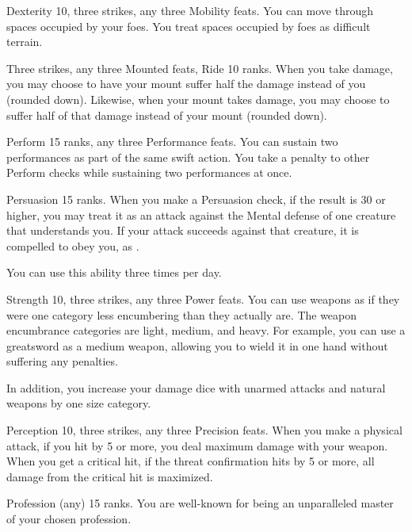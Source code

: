 \featpres Dexterity 10, three strikes, any three Mobility feats.
\featben You can move through spaces occupied by your foes.
You treat spaces occupied by foes as difficult terrain.

\featpres Three strikes, any three Mounted feats, Ride 10 ranks.
\featben When you take damage, you may choose to have your mount suffer half the damage instead of you (rounded down).
Likewise, when your mount takes damage, you may choose to suffer half of that damage instead of your mount (rounded down).

\featpres Perform 15 ranks, any three Performance feats.
\featben You can sustain two performances as part of the same swift action.
You take a  penalty to other Perform checks while sustaining two performances at once.

\featpre Persuasion 15 ranks.
\featben When you make a Persuasion check, if the result is 30 or higher, you may treat it as an attack against the Mental defense of one creature that understands you.
If your attack succeeds against that creature, it is compelled to obey you, as .

You can use this ability three times per day.

\featpres Strength 10, three strikes, any three Power feats.
\featben You can use weapons as if they were one category less encumbering than they actually are.
The weapon encumbrance categories are light, medium, and heavy.
For example, you can use a greatsword as a medium weapon, allowing you to wield it in one hand without suffering any penalties.

In addition, you increase your damage dice with unarmed attacks and natural weapons by one size category.

\featpres Perception 10, three strikes, any three Precision feats.
\featben When you make a physical attack, if you hit by 5 or more, you deal maximum damage with your weapon.
When you get a critical hit, if the threat confirmation hits by 5 or more, all damage from the critical hit is maximized.

\featpre Profession (any) 15 ranks.
\featben You are well-known for being an unparalleled master of your chosen profession.

